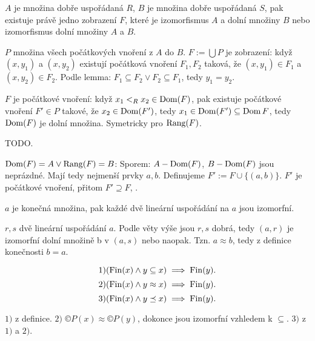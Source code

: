 \documentclass[12pt]{article}                   %
\begin{document}

    \begin{veta}
        $A$ je množina dobře uspořádaná $R$, $B$ je množina dobře uspořádaná $S$, pak existuje právě jedno zobrazení $F$, které je izomorfismus $A$ a dolní množiny $B$ nebo izomorfismus dolní množiny $A$ a $B$.

        \begin{dukazin}
            $P$ množina všech počátkových vnoření z $A$ do $B$. $F := \bigcup P$ je zobrazení: když $(x, y_1)$ a $(x, y_2)$ existují počátková vnoření $F_1, F_2$ taková, že $(x, y_1) \in F_1$ a $(x, y_2) \in F_2$. Podle lemma: $F_1 \subseteq F_2 \lor F_2 \subseteq F_1$, tedy $y_1 = y_2$.

            $F$ je počátkové vnoření: když $x_1 <_R x_2 \in \operatorname{Dom}(F)$, pak existuje počátkové vnoření $F' \in P$ takové, že $x_2 \in \operatorname{Dom}(F')$, tedy $x_1 \in \operatorname{Dom}(F') \subseteq \operatorname{Dom} F$, tedy $\operatorname{Dom}(F)$ je dolní množina. Symetricky pro $\operatorname{Rang}(F)$.

            TODO.

            $\operatorname{Dom}(F) = A \lor \operatorname{Rang}(F) = B$: Sporem: $A - \operatorname{Dom}(F)$, $B - \operatorname{Dom}(F)$ jsou neprázdné. Mají tedy nejmenší prvky $a, b$. Definujeme $F' := F \cup \{(a, b)\}$. $F'$ je počátkové vnoření, přitom $F' \supseteq F$, \lightning.
        \end{dukazin}
    \end{veta}

    \begin{veta}
        $a$ je konečná množina, pak každé dvě lineární uspořádání na $a$ jsou izomorfní.

        \begin{dukazin}
            $r, s$ dvě lineární uspořádání $a$. Podle věty výše jsou $r, s$ dobrá, tedy $(a, r)$ je izomorfní dolní množině b v $(a, s)$ nebo naopak. Tzn. $a \approx b$, tedy z definice konečnosti $b = a$.
        \end{dukazin}
    \end{veta}

    \begin{lemma}
        $$ 1) (\operatorname{Fin}(x) \land y \subseteq x) \implies \operatorname{Fin}(y). $$
        $$ 2) (\operatorname{Fin}(x) \land y \approx x) \implies \operatorname{Fin}(y). $$
        $$ 3) (\operatorname{Fin}(x) \land y \preceq x) \implies \operatorname{Fin}(y). $$ 


        \begin{dukazin}
            $1)$ z definice. $2)$ $©P(x) \approx ©P(y)$, dokonce jsou izomorfní vzhledem k $\subseteq$. $3)$ z $1)$ a $2)$.
        \end{dukazin}
    \end{lemma}
    
\end{document}
